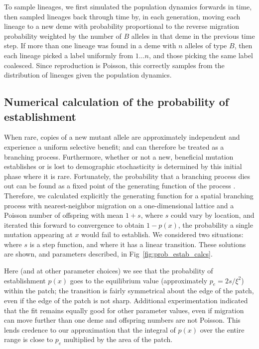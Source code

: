 \documentclass[10pt,letterpaper]{article}
\newcommand{\citep}[1]{\cite{#1}}
\begin{document}
To sample lineages, we first simulated the population dynamics forwards in time,
then sampled lineages back through time
by, in each generation,
moving each lineage to a new deme with probability proportional to the reverse migration probability
weighted by the number of $B$ alleles in that deme in the previous time step.
If more than one lineage was found in a deme with $n$ alleles of type $B$,
then each lineage picked a label uniformly from $1 \ldots n$,
and those picking the same label coalesced.
Since reproduction is Poisson, this correctly samples from the distribution of lineages given the population dynamics.

\subsection*{Numerical calculation of the probability of establishment}
\label{apx:establishment_sims}

When rare, 
copies of a new mutant allele are approximately independent and experience a uniform selective benefit;
and can therefore be treated as a branching process.
Furthermore, whether or not a new, beneficial mutation establishes or is lost to demographic stochasticity
is determined by this initial phase where it is rare.
Fortunately, the probability that a branching process dies out
can be found as a fixed point of the generating function of the process \citep{jagers1975branching}.
Therefore, we calculated explicitly the generating function for a spatial branching process
with nearest-neighbor migration on a one-dimensional lattice
and a Poisson number of offspring with mean $1+s$,
where $s$ could vary by location,
and iterated this forward to convergence to obtain $1-p(x)$, the probability a single mutation appearing at $x$ would fail to establish.
We considered two situations:
where $s$ is a step function,
and where it has a linear transition.
These solutions are shown, and parameters described, in Fig~\ref{fig:prob_estab_calcs}.

Here (and at other parameter choices) we see that the probability of establishment $p(x)$ goes to the equilibrium value
(approximately $p_e = 2s/\xi^2$) within the patch;
the transition is fairly symmetrical about the edge of the patch, even if the edge of the patch is not sharp.
Additional experimentation indicated that the fit remains equally good for other parameter values,
even if migration can move further than one deme and offspring numbers are not Poisson.
This lends credence to our approximation that the integral of $p(x)$ over the entire range
is close to $p_e$ multiplied by the area of the patch.
\end{document}
